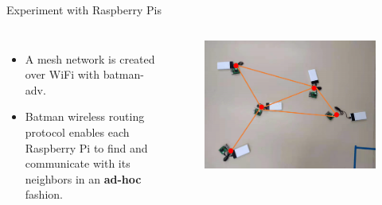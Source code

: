 \documentclass[10pt]{beamer}
\DeclareMathOperator{\1}{\textbf{1}}
\begin{document}
\begin{frame}{Experiment with Raspberry Pis}
  \begin{columns}[c]
    \column{7cm}
    \begin{itemize}
      \item A mesh network is created over WiFi with batman-adv.
      \item Batman wireless routing protocol enables each Raspberry Pi to find and communicate with its neighbors in an {\bf ad-hoc} fashion.
    \end{itemize}
    \column{5cm}
    \begin{figure}
      \centering
      \includegraphics[width=1\textwidth]{pic/rpi_expriment.png}
    \end{figure}
  \end{columns}
\end{frame}

\end{document}
